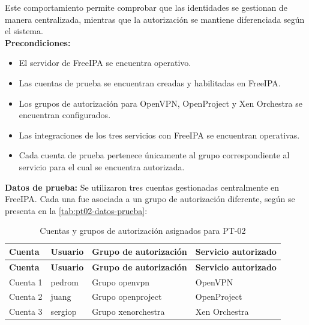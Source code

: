 Este comportamiento permite comprobar que las identidades se gestionan de manera centralizada, mientras que la autorización se mantiene diferenciada según el sistema.\\
\textbf{Precondiciones:}
\begin{itemize}
	\item El servidor de FreeIPA se encuentra operativo.
	\item Las cuentas de prueba se encuentran creadas y habilitadas en FreeIPA.
	\item Los grupos de autorización para OpenVPN, OpenProject y Xen Orchestra se encuentran configurados.
	\item Las integraciones de los tres servicios con FreeIPA se encuentran operativas.
	\item Cada cuenta de prueba pertenece únicamente al grupo correspondiente al servicio para el cual se encuentra autorizada.
\end{itemize}
\textbf{Datos de prueba:} Se utilizaron tres cuentas gestionadas centralmente en FreeIPA. Cada una fue asociada a un grupo de autorización diferente, según se presenta en la \autoref{tab:pt02-datos-prueba}:

\begingroup
\fontsize{8.5pt}{9.5pt}\selectfont
\renewcommand{\arraystretch}{1.3}
\setlength{\tabcolsep}{4pt}

\begin{longtable}{|
	>{\raggedright\arraybackslash}p{2.5cm}|
	>{\raggedright\arraybackslash}p{2.5cm}|
	>{\raggedright\arraybackslash}p{4.0cm}|
	>{\raggedright\arraybackslash}p{4.5cm}|}

	\caption{Cuentas y grupos de autorización asignados para PT-02}
	\label{tab:pt02-datos-prueba}
	\\
	\hline
	\rowcolor[gray]{0.85}
	\textbf{Cuenta}                &
	\textbf{Usuario}               &
	\textbf{Grupo de autorización} &
	\textbf{Servicio autorizado}
	\\
	\hline
	\endfirsthead

	\hline
	\rowcolor[gray]{0.85}
	\textbf{Cuenta}                &
	\textbf{Usuario}               &
	\textbf{Grupo de autorización} &
	\textbf{Servicio autorizado}
	\\
	\hline
	\endhead

	Cuenta 1                       & pedrom  & Grupo openvpn      & OpenVPN       \\ \hline
	Cuenta 2                       & juang   & Grupo openproject  & OpenProject   \\ \hline
	Cuenta 3                       & sergiop & Grupo xenorchestra & Xen Orchestra \\ \hline
\end{longtable}
\endgroup
\normalsize

